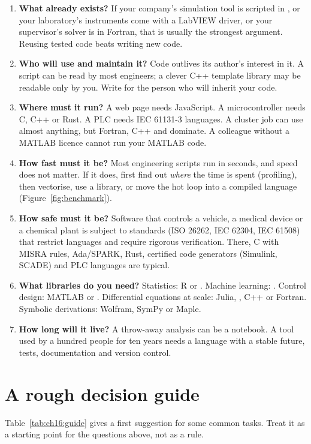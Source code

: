 \begin{enumerate}
\item \textbf{What already exists?} If your company's simulation tool is scripted in \py,
  or your laboratory's instruments come with a LabVIEW driver, or your supervisor's
  solver is in Fortran, that is usually the strongest argument. Reusing tested code beats
  writing new code.
\item \textbf{Who will use and maintain it?} Code outlives its author's interest in it. A
  \py script can be read by most engineers; a clever C++ template library may be readable
  only by you. Write for the person who will inherit your code.
\item \textbf{Where must it run?} A web page needs JavaScript. A microcontroller needs C,
  C++ or Rust. A PLC needs IEC 61131-3 languages. A cluster job can use almost anything,
  but Fortran, C++ and \py dominate. A colleague without a MATLAB licence cannot run your
  MATLAB code.
\item \textbf{How fast must it be?} Most engineering scripts run in seconds, and speed
  does not matter. If it does, first find out \emph{where} the time is spent (profiling),
  then vectorise, use a library, or move the hot loop into a compiled language
  (Figure~\ref{fig:benchmark}).
\item \textbf{How safe must it be?} Software that controls a vehicle, a medical device or
  a chemical plant is subject to standards (ISO 26262, IEC 62304, IEC 61508) that restrict
  languages and require rigorous verification. There, C with MISRA rules, Ada/SPARK, Rust,
  certified code generators (Simulink, SCADE) and PLC languages are typical.
\item \textbf{What libraries do you need?} Statistics: R or \py. Machine learning: \py.
  Control design: MATLAB or \py. Differential equations at scale: Julia, \py, C++ or
  Fortran. Symbolic derivations: Wolfram, SymPy or Maple.
\item \textbf{How long will it live?} A throw-away analysis can be a notebook. A tool used
  by a hundred people for ten years needs a language with a stable future, tests,
  documentation and version control.
\end{enumerate}

\section{A rough decision guide}

Table~\ref{tab:ch16:guide} gives a first suggestion for some common tasks. Treat it as a
starting point for the questions above, not as a rule.

